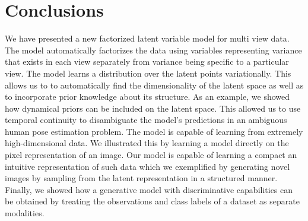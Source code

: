 \section{Conclusions \label{conclusions}}
We have presented a new factorized latent variable model for multi
view data.  The model automatically factorizes the data using
variables representing variance that exists in each view separately
from variance being specific to a particular view. 
The model learns a distribution over the latent points
variationally. This allows us to to automatically find the
dimensionality of the latent space as well as to incorporate prior
knowledge about its structure.
%
As an example, we showed how dynamical priors can be included on the latent
space. This allowed us to use temporal continuity to disambiguate the
model's predictions in an ambiguous human pose estimation problem.
%
%
The model is capable of learning from extremely high-dimensional
data. We illustrated this by learning a model directly on the pixel
representation of an image. Our model is capable of learning a compact
an intuitive representation of such data which we exemplified by
generating novel images by sampling from the latent representation in a
structured manner.
%
%
%
Finally, we showed how a generative model with discriminative
capabilities can be obtained by treating the observations and class labels
of a dataset as separate modalities.  

